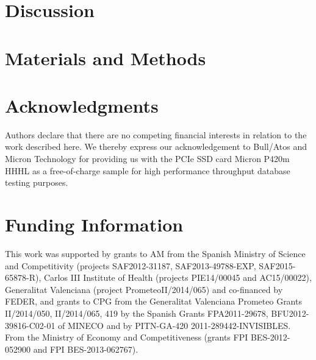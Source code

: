 \documentclass[12pt,oneside,letterpaper]{article}
\begin{document}
\section*{Discussion}

\section*{Materials and Methods}
   

\section*{Acknowledgments}
Authors declare that there are no competing financial interests in relation to the work described here. We thereby express our acknowledgement to Bull/Atos and Micron Technology for providing us with the PCIe SSD card Micron P420m HHHL as a free-of-charge sample for high performance throughput database testing purposes.

\section*{Funding Information}
This work was supported by grants to AM from the Spanish Ministry of Science and Competitivity (projects SAF2012-31187, SAF2013-49788-EXP, SAF2015-65878-R), Carlos III Institute of Health (projects PIE14/00045 and AC15/00022), Generalitat Valenciana (project PrometeoII/2014/065) and co-financed by FEDER, and grants to CPG from the Generalitat Valenciana Prometeo Grants II/2014/050, II/2014/065, 419 by the Spanish Grants FPA2011-29678, BFU2012-39816-C02-01 of MINECO and by PITN-GA-420 2011-289442-INVISIBLES. From the Ministry of Economy and Competitiveness (grants FPI BES-2012-052900 and FPI BES-2013-062767).
\end{document}
